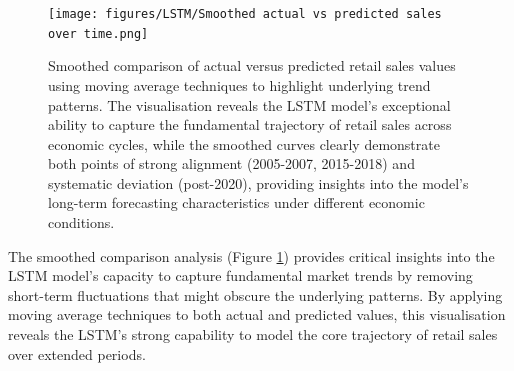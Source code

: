 \documentclass[12pt,a4paper]{report}
\begin{document}
\begin{figure}[htbp]
\centering
\texttt{[image: figures/LSTM/Smoothed actual vs predicted sales over time.png]}
\caption{Smoothed comparison of actual versus predicted retail sales values using moving average techniques to highlight underlying trend patterns. The visualisation reveals the LSTM model's exceptional ability to capture the fundamental trajectory of retail sales across economic cycles, while the smoothed curves clearly demonstrate both points of strong alignment (2005-2007, 2015-2018) and systematic deviation (post-2020), providing insights into the model's long-term forecasting characteristics under different economic conditions.}
\label{fig:smoothed_comparison}
\end{figure}

The smoothed comparison analysis (Figure \ref{fig:smoothed_comparison}) provides critical insights into the LSTM model's capacity to capture fundamental market trends by removing short-term fluctuations that might obscure the underlying patterns. By applying moving average techniques to both actual and predicted values, this visualisation reveals the LSTM's strong capability to model the core trajectory of retail sales over extended periods.
\end{document}
